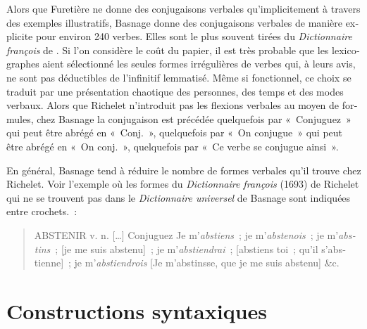 \documentclass[output=paper,colorlinks,citecolor=brown,arabicfont,chinesefont,booklanguage=french]{langscibook}
\begin{document}
\begin{otherlanguage}{french}
Alors que Furetière ne donne des conjugaisons verbales qu’implicitement à travers des exemples illustratifs, Basnage donne des conjugaisons verbales de manière explicite pour environ 240 verbes. Elles sont le plus souvent tirées du \emph{Dictionnaire françois} de \citet{Richelet1693}. Si l’on considère le coût du papier, il est très probable que les lexicographes aient sélectionné les seules formes irrégulières de verbes qui, à leurs avis, ne sont pas déductibles de l’infinitif lemmatisé. Même si fonctionnel, ce choix se traduit par une présentation chaotique des personnes, des temps et des modes verbaux. Alors que Richelet n’introduit pas les flexions verbales au moyen de formules, chez Basnage la conjugaison est précédée quelquefois par «~Conjuguez~» qui peut être abrégé en «~Conj.~», quelquefois par «~On conjugue~» qui peut être abrégé en «~On conj.~», quelquefois par «~Ce verbe se conjugue ainsi~». 

En général, Basnage tend à réduire le nombre de formes verbales qu'il trouve chez Richelet. Voir l'exemple où les formes du \emph{Dictionnaire françois} (1693) de Richelet qui ne se trouvent pas dans le \emph{Dictionnaire universel} de Basnage \citep{Furetiere1701} sont indiquées entre crochets.~:

\begin{quote}
    ABSTENIR v. n. […] Conjuguez Je m'\emph{abstiens}~; je m'\emph{abstenois}~; je m'\emph{abstins}~; [je me suis abstenu]~; je m'\emph{abstiendrai}~; [abstiens toi~; qu’il s’abstienne]~; je m’\emph{abstiendrois} [Je m’abstinsse, que je me suis abstenu] \&c.
\end{quote}

\section{Constructions syntaxiques}


\end{otherlanguage}
\end{document}

